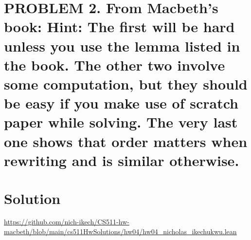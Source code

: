 \documentclass{article}
\begin{document}
\newpage

\section*{PROBLEM 2. From Macbeth’s book: Hint: The first will be hard unless you use the lemma listed in the book. The other two involve some
computation, but they should be easy if you make use of scratch paper while solving. The very last
one shows that order matters when rewriting and is similar otherwise.}
\section*{Solution}

\url{https://github.com/nich-ikech/CS511-hw-macbeth/blob/main/cs511HwSolutions/hw04/hw04_nicholas_ikechukwu.lean}
\end{document}
